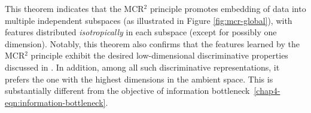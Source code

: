 \documentclass[../../book-main.tex]{subfiles}
\begin{document}

This theorem indicates that the MCR$^2$ principle promotes embedding of data into multiple independent subspaces (as illustrated in Figure \ref{fig:mcr-global}), with features distributed {\em isotropically}  in each subspace (except for possibly one dimension). Notably, this theorem also confirms that the features learned by the MCR$^2$ principle exhibit the desired low-dimensional discriminative properties discussed in . In addition, among all such discriminative representations, it prefers the one with the highest dimensions in the ambient space. This is substantially different from the objective of information bottleneck~\eqref{chap4-eqn:information-bottleneck}.
\end{document}
